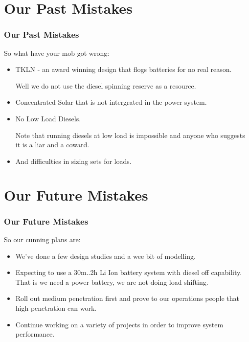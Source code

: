 \documentclass{beamer}
\begin{document}
\section{Our Past Mistakes}
\begin{frame}\frametitle{Our Past Mistakes}
So what have your mob got wrong:\pause
  \begin{itemize}
  \item TKLN - an award winning design that flogs batteries for no real reason.\pause

    Well we do not use the diesel spinning reserve as a resource.\pause
  \item Concentrated Solar that is not intergrated in the power system.\pause
  \item No Low Load Diesels.\pause

    Note that running diesels at low load is impossible and anyone who
    suggests it is a liar and a coward.\pause
  \item And difficulties in sizing sets for loads.
  \end{itemize}
  
\end{frame}

\section{Our Future Mistakes}
\begin{frame}\frametitle{Our Future Mistakes}
So our cunning plans are:
  \begin{itemize}
  \item We've done a few design studies and a wee bit of modelling.\pause
  \item Expecting to use a 30m..2h Li Ion battery system with diesel off 
    capability.\pause
    That is we need a power battery, we are not doing load shifting.\pause
  \item Roll out medium penetration first and prove to our operations people 
    that high penetration can work.\pause
  \item Continue working on a variety of projects in order to improve
    system performance.
  \end{itemize}
\end{frame}
\end{document}
